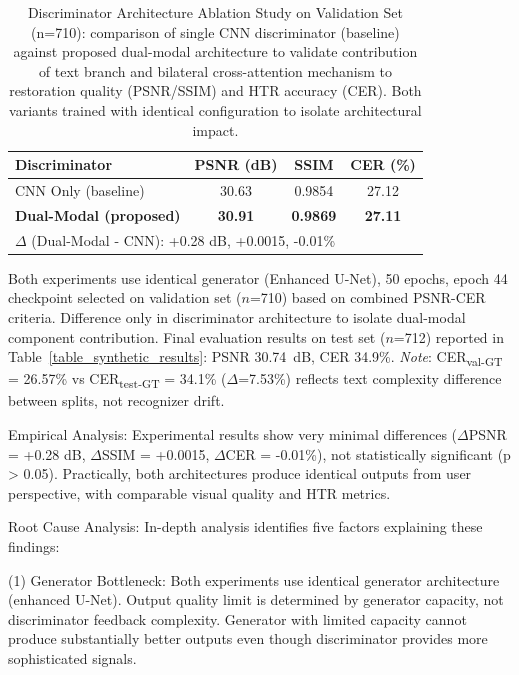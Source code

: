 \documentclass[journal]{IEEEtran}
\begin{document}
\begin{table}[!t]
\renewcommand{\arraystretch}{1.3}
\caption{Discriminator Architecture Ablation Study on Validation Set (n=710): comparison of single CNN discriminator (baseline) against proposed dual-modal architecture to validate contribution of text branch and bilateral cross-attention mechanism to restoration quality (PSNR/SSIM) and HTR accuracy (CER). Both variants trained with identical configuration to isolate architectural impact.}
\label{table_ablation_discriminator}
\centering
\begin{tabular}{|l|c|c|c|}
\hline
\textbf{Discriminator} & \textbf{PSNR (dB)} & \textbf{SSIM} & \textbf{CER (\%)} \\
\hline
CNN Only (baseline) & 30.63 & 0.9854 & 27.12 \\
\textbf{Dual-Modal (proposed)} & \textbf{30.91} & \textbf{0.9869} & \textbf{27.11} \\
\hline
\multicolumn{4}{|l|}{$\Delta$ (Dual-Modal - CNN): +0.28 dB, +0.0015, -0.01\%} \\
\hline
\end{tabular}
\vspace{2mm}

\small{Both experiments use identical generator (Enhanced U-Net), 50 epochs, epoch 44 checkpoint selected on validation set ($n$=710) based on combined PSNR-CER criteria. Difference only in discriminator architecture to isolate dual-modal component contribution. Final evaluation results on test set ($n$=712) reported in Table~\ref{table_synthetic_results}: PSNR 30.74~dB, CER 34.9\%. \textit{Note}: CER\textsubscript{val-GT} = 26.57\% vs CER\textsubscript{test-GT} = 34.1\% ($\Delta$=7.53\%) reflects text complexity difference between splits, not recognizer drift.}
\end{table}

Empirical Analysis: Experimental results show very minimal differences ($\Delta$PSNR = +0.28 dB, $\Delta$SSIM = +0.0015, $\Delta$CER = -0.01\%), not statistically significant (p > 0.05). Practically, both architectures produce identical outputs from user perspective, with comparable visual quality and HTR metrics.

Root Cause Analysis: In-depth analysis identifies five factors explaining these findings:

(1) Generator Bottleneck: Both experiments use identical generator architecture (enhanced U-Net). Output quality limit is determined by generator capacity, not discriminator feedback complexity. Generator with limited capacity cannot produce substantially better outputs even though discriminator provides more sophisticated signals.
\end{document}

